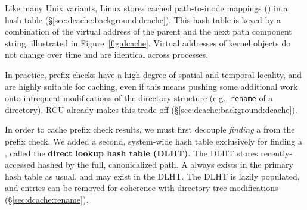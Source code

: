 Like many Unix variants, Linux stores cached path-to-inode mappings (\dentries{}) in a hash
table (\S\ref{sec:dcache:background:dcache}).  This hash table is keyed by a combination of 
the virtual address of the parent \dentry{} and the next path component string, illustrated in
Figure~\ref{fig:dcache}.  
Virtual addresses of kernel objects do not change over time and are identical across processes.

In practice, prefix checks have a high degree of spatial and temporal locality,
and are highly suitable for caching,
even if this 
means pushing some additional work onto infrequent modifications of the directory structure (e.g., {\tt rename} of a directory).
RCU already makes this trade-off (\S\ref{sec:dcache:background:dcache}).





In order to cache prefix check results, we must first decouple 
{\em finding} a \dentry{} from the prefix check.
We added a second, system-wide hash table exclusively for finding a \dentry{}, called the {\bf direct lookup hash table (DLHT)}.
The DLHT stores recently-accessed \dentries{}
hashed
by the full, canonicalized path.
A \dentry{} always exists in the primary hash table as usual,
and may exist in the DLHT.
The DLHT is lazily populated, and entries can be removed for coherence
with directory tree modifications (\S\ref{sec:dcache:rename}).

